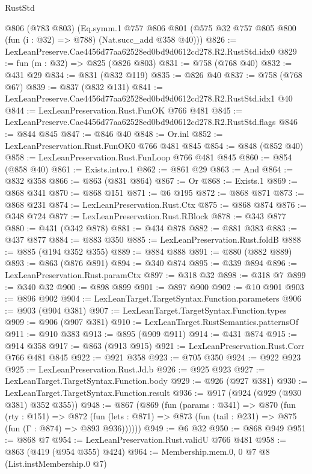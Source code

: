 \begin{lexlean}{RustStd}
\begin{coremodule}
    @806
    (@783 @803)
    (Eq.symm.{1}
      @757
      @806
      @801
      (@575 @32 @757 @805 @800 (fun (i : @32) => @788) (Nat.succ_add @358 @40)))
@826 := LexLeanPreserve.Cae4456d77aa62528ed0bd9d0612cd278.R2.RustStd.idx0
@829 := fun (m : @32) => @825 (@826 @803)
@831 := @758 (@768 @40)
@832 := @431 @29
@834 := @831 (@832 @119)
@835 := @826 @40
@837 := @758 (@768 @67)
@839 := @837 (@832 @131)
@841 := LexLeanPreserve.Cae4456d77aa62528ed0bd9d0612cd278.R2.RustStd.idx1 @40
@844 := LexLeanPreservation.Rust.FunOK @766 @481
@845 := LexLeanPreserve.Cae4456d77aa62528ed0bd9d0612cd278.R2.RustStd.flags
@846 := @844 @845
@847 := @846 @40
@848 := Or.inl
@852 := LexLeanPreservation.Rust.FunOK0 @766 @481 @845
@854 := @848 (@852 @40)
@858 := LexLeanPreservation.Rust.FunLoop @766 @481 @845
@860 := @854 (@858 @40)
@861 := Exists.intro.{1}
@862 := @861 @29
@863 := And
@864 := @832 @358
@866 := @863 (@831 @864)
@867 := Or
@868 := Exists.{1}
@869 := @868 @341
@870 := @868 @151
@871 := @6 @195
@872 := @868 @871
@873 := @868 @231
@874 := LexLeanPreservation.Rust.Ctx
@875 := @868 @874
@876 := @348 @724
@877 := LexLeanPreservation.Rust.RBlock
@878 := @343 @877
@880 := @431 (@342 @878)
@881 := @434 @878
@882 := @881 @383
@883 := @437 @877
@884 := @883 @350
@885 := LexLeanPreservation.Rust.foldB
@888 := @885 (@194 @352 @355)
@889 := @884 @888
@891 := @880 (@882 @889)
@893 := @863 (@876 @891)
@894 := @340 @874
@895 := @339 @894
@896 := LexLeanPreservation.Rust.paramCtx
@897 := @318 @32
@898 := @318 @7
@899 := @340 @32
@900 := @898 @899
@901 := @897 @900
@902 := @10 @901
@903 := @896 @902
@904 := LexLeanTarget.TargetSyntax.Function.parameters
@906 := @903 (@904 @381)
@907 := LexLeanTarget.TargetSyntax.Function.types
@909 := @906 (@907 @381)
@910 := LexLeanTarget.RustSemantics.patternsOf
@911 := @910 @383
@913 := @895 (@909 @911)
@914 := @431 @874
@915 := @914 @358
@917 := @863 (@913 @915)
@921 := LexLeanPreservation.Rust.Corr @766 @481 @845
@922 := @921 @358
@923 := @705 @350
@924 := @922 @923
@925 := LexLeanPreservation.Rust.Jd.b
@926 := @925 @923
@927 := LexLeanTarget.TargetSyntax.Function.body
@929 := @926 (@927 @381)
@930 := LexLeanTarget.TargetSyntax.Function.result
@936 := @917 (@924 (@929 (@930 @381) @352 @355))
@948 := @867
    (@869
      (fun (params : @341) =>
      @870
        (fun (rty : @151) =>
        @872
          (fun (lets : @871) => @873 (fun (tail : @231) => @875 (fun (Γ : @874) => @893 @936))))))
@949 := @6 @32
@950 := @868 @949
@951 := @868 @7
@954 := LexLeanPreservation.Rust.validU @766 @481
@958 := @863 (@419 (@954 @355) @424)
@964 := Membership.mem.{0, 0} @7 @8 (List.instMembership.{0} @7)

\end{coremodule}
\end{lexlean}
